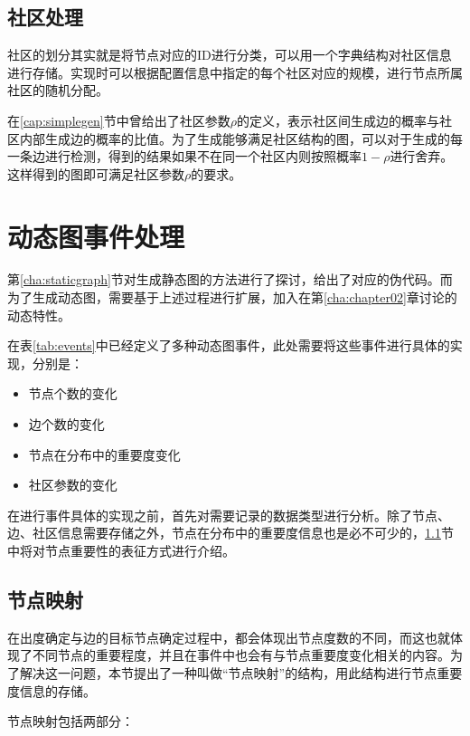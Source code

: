 \subsection{社区处理}
\label{cha:Community}

社区的划分其实就是将节点对应的ID进行分类，可以用一个字典结构对社区信息进行存储。实现时可以根据配置信息中指定的每个社区对应的规模，进行节点所属社区的随机分配。

在\ref{cap:simplegen}节中曾给出了社区参数$\rho$的定义，表示社区间生成边的概率与社区内部生成边的概率的比值。为了生成能够满足社区结构的图，可以对于生成的每一条边进行检测，得到的结果如果不在同一个社区内则按照概率$1-\rho$进行舍弃。这样得到的图即可满足社区参数$\rho$的要求。

\section{动态图事件处理}

第\ref{cha:staticgraph}节对生成静态图的方法进行了探讨，给出了对应的伪代码。而为了生成动态图，需要基于上述过程进行扩展，加入在第\ref{cha:chapter02}章讨论的动态特性。

在表\ref{tab:events}中已经定义了多种动态图事件，此处需要将这些事件进行具体的实现，分别是：

\begin{itemize}
  \item 节点个数的变化
  \item 边个数的变化
  \item 节点在分布中的重要度变化
  \item 社区参数的变化
\end{itemize}

\vspace{0.2cm}

在进行事件具体的实现之前，首先对需要记录的数据类型进行分析。除了节点、边、社区信息需要存储之外，节点在分布中的重要度信息也是必不可少的，\ref{cha:node_map}节中将对节点重要性的表征方式进行介绍。

\subsection{节点映射}
\label{cha:node_map}

在出度确定与边的目标节点确定过程中，都会体现出节点度数的不同，而这也就体现了不同节点的重要程度，并且在事件中也会有与节点重要度变化相关的内容。为了解决这一问题，本节提出了一种叫做“节点映射”的结构，用此结构进行节点重要度信息的存储。

节点映射包括两部分：

